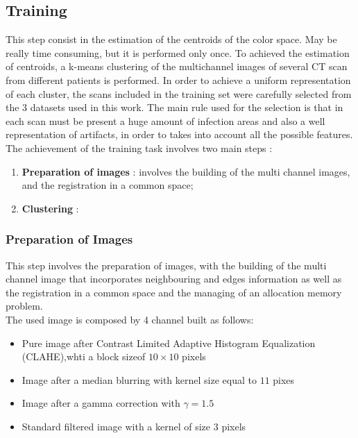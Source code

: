 
	
	\subsection{Training}
	
	This step consist in the estimation of the centroids of the color space. May be  really time consuming, but it is performed only once. 
	To achieved the estimation of centroids, a k-means clustering of the multichannel images of several CT scan from different patients is performed. 
	In order to achieve a uniform representation of each cluster, the scans included in the training set were carefully selected from the $3$ datasets used in this work. The main rule used for the selection is that in each scan must be present a huge amount of infection areas and also a well representation of artifacts, in order to takes into account all the possible features.
	The achievement of the training task involves two main steps : 
	\begin{enumerate}
		\item \textbf{Preparation of images} : involves the building of the multi channel images, and the registration in a common space; 
		
		\item \textbf{Clustering} :%
	\end{enumerate}

		\subsubsection*{Preparation of Images} 
		
		
	
		This step involves the preparation of images, with the building of the multi channel image that incorporates neighbouring and edges information as well as the registration in a common space and the managing of an allocation memory problem.\\
			
		The used image is composed by 4 channel built as follows:  
		\begin{itemize}
			\item Pure image after Contrast Limited Adaptive Histogram Equalization (CLAHE),whti a block sizeof  $10\times 10$ pixels
			\item Image after a median blurring with kernel size equal to $11$ pixes
			\item Image after a gamma correction with $\gamma = 1.5$
			\item Standard filtered image with a kernel of size $3$ pixels
		\end{itemize}
	
